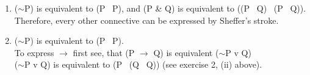 \documentclass[a4paper,12pt]{article}
\newcommand{\ra}{$\rightarrow$ }
\newcommand{\s}{$\sim$}
\newcommand{\tb}{\textbar \ }
\begin{document}
\begin{enumerate}[label=\arabic*,leftmargin=*]
\begin{enumerate}[label=(\roman*)]
            \end{enumerate}

        \item (\s P) is equivalent to (P \tb P), and (P \& Q) is equivalent to ((P \tb Q) \tb (P \tb Q)). Therefore, every other connective can be expressed by Sheffer's stroke.

        \item (\s P) is equivalent to (P \tb P).\\
            To express \ra first see, that (P \ra Q) is equivalent (\s P v Q)\\
            (\s P v Q) is equivalent to (P \tb (Q \tb Q)) (see exercise 2, (ii) above).

    \end{enumerate}
\end{document}
